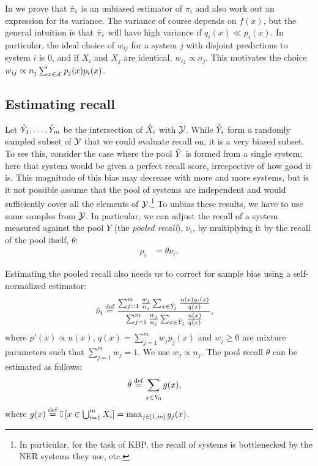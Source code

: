 In  we prove that ${\hat{\pi}}_i$ is an unbiased estimator of $\pi_i$ and also work out an expression for its variance. 
The variance of course depends on $f(x)$, but the general intuition is that 
${\hat{\pi}}_i$ will have high variance if $q_i(x) \ll p_i(x)$.
In particular, the ideal choice of $w_{ij}$ for a system $j$ with disjoint predictions to system $i$ is $0$, and if $X_i$ and $X_j$ are identical, $w_{ij} \propto n_{j}$.
This motivates the choice $w_{ij} \propto n_{j} \sum_{x \in \mathcal{X}} p_j(x) p_i(x)$.

\subsection{Estimating recall}
Let ${\hat{Y}}_1, \ldots, {\hat{Y}}_m$ be the intersection of ${\hat{X}}_i$ with $\mathcal{Y}$.
While ${\hat{Y}}_i$ form a randomly sampled subset of $\mathcal{Y}$ that we could evaluate recall on, it is a very biased subset.
To see this, consider the case where the pool ${\hat{Y}}$ is formed from a single system; here that system would be given a perfect recall score, irrespective of how good it is.
This magnitude of this bias may decrease with more and more systems, but is it not possible assume that the pool of systems are independent and would sufficiently cover all the elements of $\mathcal{Y}$.\footnote{
  In particular, for the task of KBP, the recall of systems is bottlenecked by the NER systems they use, etc.
}
To unbias these results, we have to use some samples from $\mathcal{Y}$.
In particular, we can adjust the recall of a system measured against the pool $Y$ (the \textit{pooled recall}), $\nu_i$, by multiplying it by the recall of the pool itself, $\theta$:
\begin{align*}
  \rho_i &= \theta \nu_i.
\end{align*}

Estimating the pooled recall also needs us to correct for sample bias using a self-normalized estimator:
\begin{align*}
  {\hat{\nu}}_i &\stackrel{\rm def}{=} \frac{\sum_{j=1}^m \frac{w_j}{n_j} \sum_{x \in {\hat{Y}}_j} \frac{u(x) g_i(x)}{q(x)}}{\sum_{j=1}^m \frac{w_j}{n_j} \sum_{x \in {\hat{Y}}_j} \frac{u(x)}{q(x)}},
\end{align*}
where $p'(x) \propto u(x)$, $q(x) = \sum_{j=1}^m w_{j} p_j(x)$ and $w_{j} \ge 0$ are mixture parameters such that $\sum_{j=1}^m w_{j} = 1$. We use $w_j \propto n_j$.
The pool recall $\theta$ can be estimated as follows:
\begin{align*}
  {\hat{\theta}} &\stackrel{\rm def}{=} \sum_{x \in {\hat{Y}}_0} g(x),
\end{align*}
where $g(x) \stackrel{\rm def}{=} \mathbb{I}\left[ x \in \bigcup_{i=1}^m X_i \right] = \max_{j \in [1,m]} g_j(x)$.

